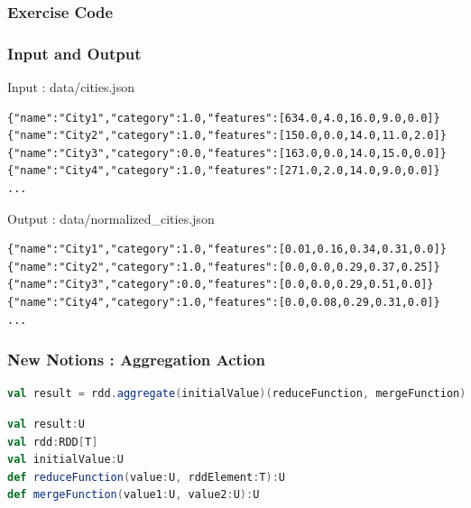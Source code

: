 \documentclass[slidetop,9pt,utf8]{beamer}
\begin{document}
\begin{CJK}{UTF8}{gbsn}
\begin{frame}
\end{frame}

\begin{frame}
  \frametitle{Exercise Code}

  

\end{frame}

\begin{frame}[fragile]

  \frametitle{Input and Output}
  
  \begin{block}{Input : data/cities.json}
    \begin{verbatim}
{"name":"City1","category":1.0,"features":[634.0,4.0,16.0,9.0,0.0]}
{"name":"City2","category":1.0,"features":[150.0,0.0,14.0,11.0,2.0]}
{"name":"City3","category":0.0,"features":[163.0,0.0,14.0,15.0,0.0]}
{"name":"City4","category":1.0,"features":[271.0,2.0,14.0,9.0,0.0]}
...
    \end{verbatim}
  \end{block}

  \begin{block}{Output : data/normalized\_cities.json}
    \begin{verbatim}
{"name":"City1","category":1.0,"features":[0.01,0.16,0.34,0.31,0.0]}
{"name":"City2","category":1.0,"features":[0.0,0.0,0.29,0.37,0.25]}
{"name":"City3","category":0.0,"features":[0.0,0.0,0.29,0.51,0.0]}
{"name":"City4","category":1.0,"features":[0.0,0.08,0.29,0.31,0.0]}
...
    \end{verbatim}
  \end{block}

\end{frame}

\begin{frame}[fragile]
  \frametitle{New Notions : Aggregation Action}


  \begin{lstlisting}[label=Aggregate, caption=Aggregation over an RDD, language=scala, style=code]
val result = rdd.aggregate(initialValue)(reduceFunction, mergeFunction)
  \end{lstlisting}


  \begin{lstlisting}[label=AggregateType, caption=Types over aggregate, language=scala, style=code]
val result:U
val rdd:RDD[T]
val initialValue:U
def reduceFunction(value:U, rddElement:T):U
def mergeFunction(value1:U, value2:U):U
  \end{lstlisting}


\end{frame}
\end{CJK}
\end{document}

